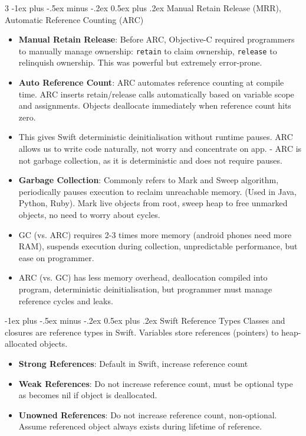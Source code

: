 \documentclass[a4paper, 9pt, landscape]{extarticle}
\makeatletter
\renewcommand{\subsection}{\@startsection{subsubsection}{3}{0mm}%
                                {-1ex plus -.5ex minus -.2ex}%
                                {0.5ex plus .2ex}%
                                {\normalfont\small\bfseries}}
\makeatother
\begin{document}
\begin{multicols*}{3}
\subsection{Manual Retain Release (MRR), Automatic Reference Counting (ARC)}

\begin{itemize}
  \item \textbf{Manual Retain Release}: Before ARC, Objective-C required programmers to manually manage ownership: \texttt{retain} to claim ownership, \texttt{release} to relinquish ownership. This was powerful but extremely error-prone.
  \item \textbf{Auto Reference Count}: ARC automates reference counting at compile time. ARC inserts retain/release calls automatically based on variable scope and assignments. Objects deallocate immediately when reference count hits zero.
  \item This gives Swift deterministic deinitialisation without runtime pauses. ARC allows us to write code naturally, not worry and concentrate on app. - ARC is not garbage collection, as it is deterministic and does not require pauses.
  \item \textbf{Garbage Collection}: Commonly refers to Mark and Sweep algorithm, periodically pauses execution to reclaim unreachable memory. (Used in Java, Python, Ruby). Mark live objects from root, sweep heap to free unmarked objects, no need to worry about cycles.
  \item GC (vs. ARC) requires 2-3 times more memory (android phones need more RAM), suspends execution during collection, unpredictable performance, but ease on programmer. 
  \item ARC (vs. GC) has less memory overhead, deallocation compiled into program, deterministic deinitialisation, but programmer must manage reference cycles and leaks.
\end{itemize}

\subsection{Swift Reference Types}
Classes and closures are reference types in Swift. Variables store references (pointers) to heap-allocated objects.

\begin{itemize}
  \item \textbf{Strong References}: Default in Swift, increase reference count
  \item \textbf{Weak References}: Do not increase reference count, must be optional type as becomes nil if object is deallocated.
  \item \textbf{Unowned References}: Do not increase reference count, non-optional. Assume referenced object always exists during lifetime of reference.
\end{itemize}


\end{multicols*}
\end{document}
